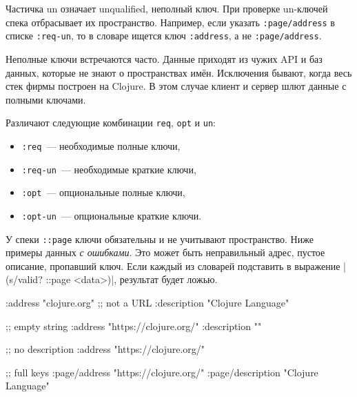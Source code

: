 
Частичка un означает unqualified, неполный ключ. При проверке un-ключей
спека отбрасывает их пространство. Например, если указать \verb|:page/address|
в списке \verb|:req-un|, то в словаре ищется ключ \verb|:address|, а не
\verb|:page/address|.

Неполные ключи встречаются часто. Данные приходят из чужих API и баз данных,
которые не знают о пространствах имён. Исключения бывают, когда весь стек фирмы
построен на Clojure. В этом случае клиент и сервер шлют данные с полными
ключами.

Различают следующие комбинации \verb|req|, \verb|opt| и \verb|un|:

\begin{itemize}

\item
  \verb|:req|~--- необходимые полные ключи,

\item
  \verb|:req-un|~--- необходимые краткие ключи,


\item
  \verb|:opt|~--- опциональные полные ключи,


\item
  \verb|:opt-un|~--- опциональные краткие ключи.

\end{itemize}

У спеки \verb|::page| ключи обязательны и не учитывают пространство. Ниже
примеры данных \emph{с ошибками}. Это может быть неправильный адрес, пустое
описание, пропавший ключ. Если каждый из словарей подставить в выражение
\spverb|(s/valid? ::page <data>)|, результат будет ложью.

\ifx\devicetype\mobile

\begin{english}
  \begin{clojure}
{:address "clojure.org" ;; not a URL
 :description "Clojure Language"}

;; empty string
{:address "https://clojure.org/"
 :description ""}

;; no description
{:address "https://clojure.org/"}

 ;; full keys
{:page/address "https://clojure.org/"
 :page/description "Clojure Language"}
  \end{clojure}
\end{english}

